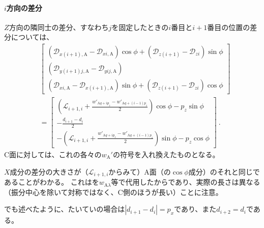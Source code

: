 \paragraph*{$i$方向の差分}
$Z$方向の隣同士の差分、すなわち$j$を固定したときの$i$番目と$i+1$番目の位置の差分については、
\begin{align*}
 &\left[
  \begin{array}{c}
    (\mathcal D_{x(i+1),\mathrm A}-\mathcal D_{xi,\mathrm A})\cos\phi
    +(\mathcal D_{z(i+1)}-\mathcal D_{zi})\sin\phi\\
    (\mathcal D_{y(i+1)j,\mathrm A}-\mathcal D_{yij,\mathrm A})\\
    (\mathcal D_{xi,\mathrm A}-\mathcal D_{x(i+1),\mathrm A})\sin\phi
    +(\mathcal D_{z(i+1)}-\mathcal D_{zi})\cos\phi
  \end{array}
  \right]\\
 &= \left[
    \begin{array}{c}
      \displaystyle
      \left(\mathcal L_{i+1, i}+\frac{w'_{\mathrm Aq+ip_z}-w'_{\mathrm Aq+(i-1)p_z}}2\right)\cos\phi
      -p_z\sin\phi\\[6pt]
      \displaystyle-\frac{d_{i+1}-d_i}2\\[6pt]
      \displaystyle
      -\left(\mathcal L_{i+1, i}+\frac{w'_{\mathrm Aq+ip_z}-w'_{\mathrm Aq+(i-1)p_z}}2\right)\sin\phi
      -p_z\cos\phi
    \end{array}
    \right]\ .
\end{align*}
C面に対しては、これの各々の\InnerDiameter$w_\mathrm A'$の符号を入れ換えたものとなる。
\begin{hosoku}
$X$成分の差分の大きさが（$\mathcal L_{i+1, i}$からみて）A面（の$\cos\phi$成分）のそれと同じであることがわかる。
これは\HorizontalID を$w_{\mathrm A\lambda}$等で代用したからであり、実際の長さは異なる（振分中心を除いて対称ではなく、C側のほうが長い）ことに注意。
\end{hosoku}
\begin{hosoku}[label=hosoku:generallyDimpleN]
でも述べたように、たいていの場合は$|d_{i+1}-d_i|=p_x$であり、また$d_{i+2} = d_i$である。
\end{hosoku}


